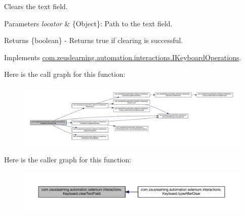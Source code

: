 Clears the text field.


\begin{DoxyParams}{Parameters}
{\em locator} & \{Object\}\+: Path to the text field. \\
\hline
\end{DoxyParams}
\begin{DoxyReturn}{Returns}
\{boolean\} -\/ Returns {\ttfamily true} if clearing is successful. 
\end{DoxyReturn}


Implements \hyperlink{interfacecom_1_1zeuslearning_1_1automation_1_1interactions_1_1IKeyboardOperations_adc477d38d61dc6aa4fc9c9749a20d773}{com.\+zeuslearning.\+automation.\+interactions.\+I\+Keyboard\+Operations}.

Here is the call graph for this function\+:
\nopagebreak
\begin{figure}[H]
\begin{center}
\leavevmode
\includegraphics[width=350pt]{d1/d26/classcom_1_1zeuslearning_1_1automation_1_1selenium_1_1interactions_1_1Keyboard_aa50940a7a030455246ba1c3ee3d62d85_cgraph}
\end{center}
\end{figure}
Here is the caller graph for this function\+:
\nopagebreak
\begin{figure}[H]
\begin{center}
\leavevmode
\includegraphics[width=350pt]{d1/d26/classcom_1_1zeuslearning_1_1automation_1_1selenium_1_1interactions_1_1Keyboard_aa50940a7a030455246ba1c3ee3d62d85_icgraph}
\end{center}
\end{figure}
\hypertarget{classcom_1_1zeuslearning_1_1automation_1_1selenium_1_1interactions_1_1Keyboard_af0c2d93c6dca53eea5fe996df3f85af7}{}\label{classcom_1_1zeuslearning_1_1automation_1_1selenium_1_1interactions_1_1Keyboard_af0c2d93c6dca53eea5fe996df3f85af7} 
